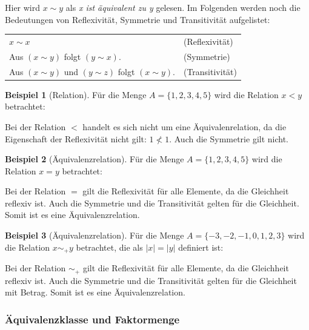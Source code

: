 \documentclass[12pt,a4paper, usenames, dvipsnames]{article}
\theoremstyle{mystyle}
\theoremstyle{definition}
\newtheorem{bsp}{Beispiel}[definition]
\begin{document}
Hier wird $x \sim y$ als \textit{x ist äquivalent zu y} gelesen. Im Folgenden werden noch die Bedeutungen von Reflexivität, Symmetrie und Transitivität aufgelistet:

\begin{center}
\begin{tabular}{ll}
$x \sim x$ & (Reflexivität) \\
Aus $(x \sim y)$ folgt $(y \sim x)$. & (Symmetrie) \\
Aus $(x \sim y)$ und $(y \sim z)$ folgt $(x \sim y)$. & (Transitivität) \\
\end{tabular}
\end{center}


\begin{bsp}[Relation]


Für die Menge $A=\{ 1, 2, 3, 4, 5 \}$ wird die Relation $ x < y$ betrachtet:

Bei der Relation $< $ handelt es sich nicht um eine Äquivalenrelation, da die Eigenschaft der Reflexivität nicht gilt: $1 \nless 1$. Auch die Symmetrie gilt nicht.


\end{bsp}
\begin{bsp}[Äquivalenzrelation]
Für die Menge $A=\{ 1, 2, 3, 4, 5 \}$ wird die Relation $ x = y$ betrachtet:

Bei der Relation $=$ gilt die Reflexivität für alle Elemente, da die Gleichheit reflexiv ist. Auch die Symmetrie und die Transitivität gelten für die Gleichheit. Somit ist es eine Äquivalenzrelation. 


\end{bsp}

\begin{bsp}[Äquivalenzrelation]
Für die Menge $A=\{ -3, -2, -1, 0, 1, 2, 3 \}$ wird die Relation $x \sim_+ y$ betrachtet, die als $|x| =|y|$ definiert ist:

Bei der Relation $\sim_+$ gilt die Reflexivität für alle Elemente, da die Gleichheit reflexiv ist. Auch die Symmetrie und die Transitivität gelten für die Gleichheit mit Betrag. Somit ist es eine Äquivalenzrelation. 


\end{bsp}

\subsubsection*{Äquivalenzklasse und Faktormenge} 
\label{Abschnitt_FaktormengenUndÄquivalenzklasse}
\end{document}
